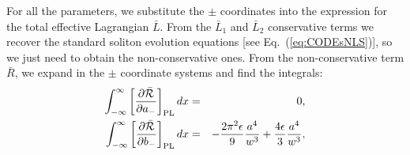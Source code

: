 {For all the parameters, we substitute the $\pm$ coordinates into the expression for the total effective Lagrangian $\bar{L}$.
From the $\bar{L}_1$ and $\bar{L}_2$ conservative terms we recover the standard soliton evolution equations [see Eq.~(\ref{eq:CODEsNLS})], so we just need to obtain the non-conservative ones.
From the non-conservative term $\bar{R}$, we expand in the $\pm$ coordinate systems and find the integrals:
\begin{eqnarray}
\int_{-\infty}^{\infty} \left[ \frac{\partial  \bar{\mathcal{R}}}{\partial a_-} \right]_{\rm PL} dx &=& 0,  \nonumber  \\
\int_{-\infty}^{\infty} \left[ \frac{\partial  \bar{\mathcal{R}}}{\partial b_-} \right]_{\rm PL} dx &=& -\frac{2\pi^2\epsilon}{9}  \frac{a^4}{w^3} + \frac{4\epsilon}{3} \frac{a^4}{w^3}, \nonumber \\

\end{eqnarray}}
